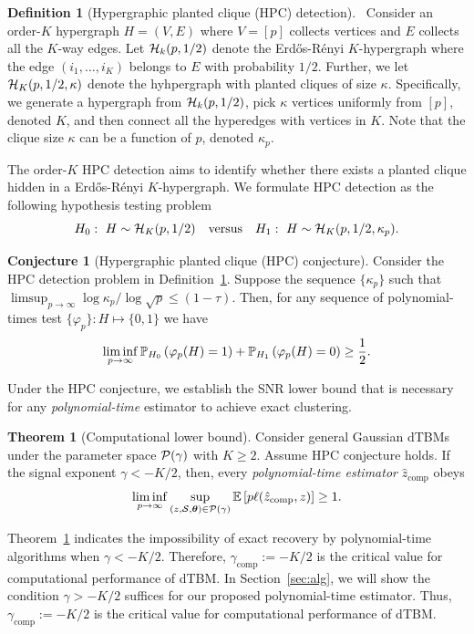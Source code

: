\documentclass[lettersize,onecolumn,journal]{IEEEtran}
\theoremstyle{definition}
\newtheorem{thm}{Theorem}
\theoremstyle{definition}
\newtheorem{defn}{Definition}
\newtheorem{conjecture}{Conjecture}
\newcommand{\of}[1]{\left(#1\right)}
\begin{document}
\begin{defn}[Hypergraphic planted clique (HPC) detection]~\label{def:HPC} Consider an order-$K$ hypergraph $H = (V,E)$ where $V = [p]$ collects vertices and $E$ collects all the $K$-way edges. Let $\mathcal{H}_k(p, 1/2)$ denote the Erd\H{o}s-R\'{e}nyi $K$-hypergraph where the edge $(i_1,\ldots, i_K)$ belongs to $E$ with probability $1/2$. Further, we let $\mathcal{H}_K(p, 1/2, \kappa)$ denote the hyhpergraph with planted cliques of size $\kappa$. Specifically, we generate a hypergraph from $\mathcal{H}_k(p, 1/2)$, pick $\kappa$ vertices uniformly from $[p]$, denoted $K$, and then connect all the hyperedges with vertices in $K$. Note that the clique size $\kappa$ can be a function of $p$, denoted $\kappa_p$. 

The order-$K$ HPC detection aims to identify whether there exists a planted clique hidden in a Erd\H{o}s-R\'{e}nyi $K$-hypergraph. We formulate HPC detection as the following hypothesis testing problem
\begin{equation}
    H_0:\ H \sim \mathcal{H}_K(p,1/2) \quad \text{versus} \quad H_1: \ H \sim \mathcal{H}_K(p,1/2, \kappa_p).
\end{equation}
\end{defn}

\begin{conjecture}[Hypergraphic planted clique (HPC) conjecture]\label{hypo:HPC} Consider the HPC detection problem in Definition~\ref{def:HPC}. Suppose the sequence $\{\kappa_p\}$ such that $\limsup_{p \rightarrow \infty} \log \kappa_p/ \log \sqrt{p} \leq (1 - \tau)$. Then, for any sequence of polynomial-times test $\{ \varphi_p\}: H \mapsto \{0,1\}$ we have 
\begin{equation}
    \liminf_{p \rightarrow \infty} \bbP_{H_0} \of{ \varphi_p(H) =1 } +  \bbP_{H_1} \of{ \varphi_p(H) =0} \geq \frac{1}{2}.
\end{equation}
\end{conjecture}

Under the HPC conjecture, we establish the SNR lower bound that is necessary for any \emph{polynomial-time} estimator to achieve exact clustering.

\begin{thm}[Computational lower bound]\label{thm:comp} Consider general Gaussian dTBMs under the parameter space $\mathcal{P}(\gamma)$ with $K\geq 2$. Assume HPC conjecture holds. If the signal exponent $\gamma < -K/2$, then, every \emph{polynomial-time estimator} $\hat z_{\text{comp}}$ obeys
\begin{align}
   \liminf_{p\to \infty}\sup_{(z, \mathcal{S}, \boldsymbol{\theta}) \in \mathcal{P}(\gamma)}  \mathbb{E} \left[ p\ell(\hat z_{\text{comp}}, z) \right]\geq 1.
\end{align}
\end{thm}
Theorem~\ref{thm:comp} indicates the impossibility of exact recovery by polynomial-time algorithms when $\gamma < -K/2$.  Therefore, $\gamma_{\text{comp}}:=-K/2$ is the critical value for computational performance of dTBM.  In Section~\ref{sec:alg}, we will show the condition $\gamma> -K/2$ suffices for our proposed polynomial-time estimator. Thus, $\gamma_{\text{comp}}:=-K/2$ is the critical value for computational performance of dTBM.  
\end{document}
